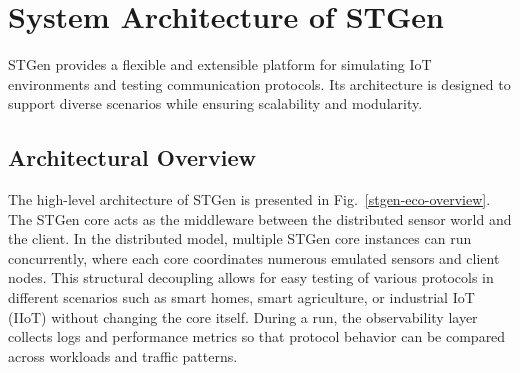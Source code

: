 \documentclass[jsan,article,submit,moreauthors,pdftex]{Definitions/mdpi}
\begin{document}
\section{System Architecture of STGen}

\label{sec:system_architecture}

STGen provides a flexible and extensible platform for simulating {IoT} environments and testing communication protocols. Its architecture is designed to support diverse scenarios while ensuring scalability and modularity.


\subsection{Architectural Overview}
\label{sec:sub_architectural_overview}

The high-level architecture of STGen is presented in Fig.~\ref{stgen-eco-overview}. The STGen core acts as the middleware between the distributed sensor world and the client. In the distributed model, multiple STGen core instances can run concurrently, where each core coordinates numerous emulated sensors and client nodes. This structural decoupling allows for easy testing of various protocols in different scenarios such as smart homes, smart agriculture, or industrial {IoT} (IIoT) \cite{stojkoska2017review, sfar2018roadmap} without changing the core itself. During a run, the observability layer collects logs and performance metrics so that protocol behavior can be compared across workloads and traffic patterns.
\end{document}
